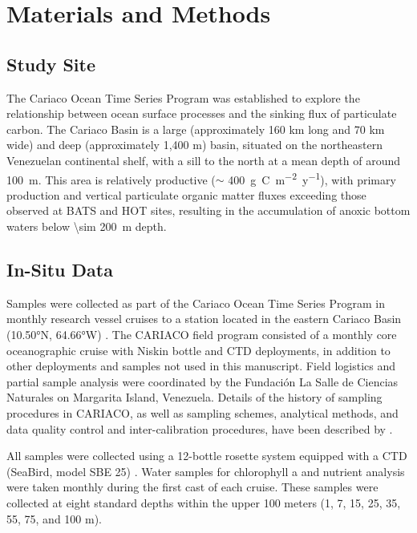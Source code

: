 \documentclass[draft]{agujournal2019}
\begin{document}
\section{Materials and Methods}
%
\subsection{Study Site}
    The Cariaco Ocean Time Series Program was established to explore the relationship between ocean surface processes and the sinking flux of particulate carbon. The Cariaco Basin is a large (approximately 160 km long and 70 km wide) and deep (approximately 1,400 m) basin, situated on the northeastern Venezuelan continental shelf, with a sill to the north at a mean depth of around \qty{100}{m}. This area is relatively productive ($\sim$ \qty{400}{g.C.m^{-2}.y^{-1}}), with primary production and vertical particulate organic matter fluxes exceeding those observed at BATS and HOT sites, resulting in the accumulation of anoxic bottom waters below \qty{\sim 200}{m} depth.

\subsection{In-Situ Data}
    Samples were collected as part of the Cariaco Ocean Time Series Program in monthly research vessel cruises to a station located in the eastern Cariaco Basin (\ang{10.50}N, \ang{64.66}W) \cite{muller-karger_scientific_2019}.
    The CARIACO field program consisted of a monthly core oceanographic cruise with Niskin bottle and CTD deployments, in addition to other deployments and samples not used in this manuscript. Field logistics and partial sample analysis were coordinated by the Fundación La Salle de Ciencias Naturales on Margarita Island, Venezuela. Details of the history of sampling procedures in CARIACO, as well as sampling schemes, analytical methods, and data quality control and inter-calibration procedures, have been described by . 
    
    All samples were collected using a 12-bottle rosette system equipped with a CTD (SeaBird, model SBE 25) \cite{astor_yrene_m_handbook_2013}. Water samples for chlorophyll a and nutrient analysis were taken monthly during the first cast of each cruise. These samples were collected at eight standard depths within the upper 100 meters (1, 7, 15, 25, 35, 55, 75, and 100 m). 
\end{document}
